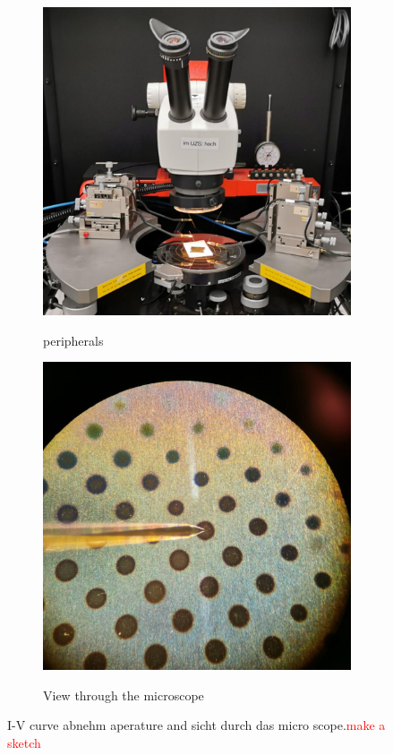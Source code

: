 \documentclass[a4paper]{article}
\newcommand{\td}[1]{\textcolor{red}{#1}}
\begin{document}
\begin{figure}
	\centering
	\begin{subfigure}{0.48\textwidth}
		\centering
		\includegraphics[width=.9\textwidth]{Pics/i-v.png}
		\label{fig:iv-agilent}
		\caption{peripherals}
	\end{subfigure}
	\begin{subfigure}{0.48\textwidth}
		\centering
		\includegraphics[width=.9\textwidth]{Pics/i-v-micro.png}
		\label{fig:iv-micro}
		\caption{View through the microscope}
	\end{subfigure}
	\label{fig:iv}
    \caption{I-V curve abnehm aperature and sicht durch das micro scope.\td{make a sketch}}

\end{figure}
\end{document}
